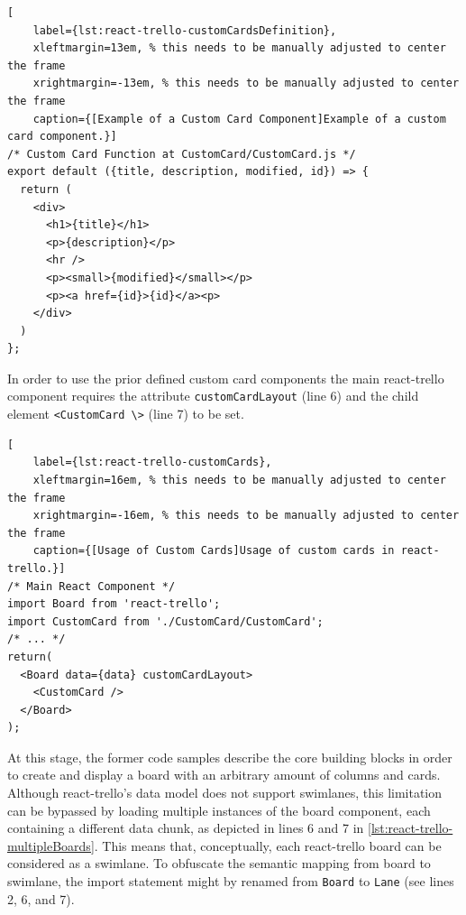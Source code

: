 \begin{spacing}{0.9}
    \lstset{language=JavaScript}
    \begin{lstlisting}[
    label={lst:react-trello-customCardsDefinition},
    xleftmargin=13em, % this needs to be manually adjusted to center the frame
    xrightmargin=-13em, % this needs to be manually adjusted to center the frame
    caption={[Example of a Custom Card Component]Example of a custom card component.}]
/* Custom Card Function at CustomCard/CustomCard.js */
export default ({title, description, modified, id}) => {
  return (
    <div>
      <h1>{title}</h1>
      <p>{description}</p>
      <hr />
      <p><small>{modified}</small></p>
      <p><a href={id}>{id}</a><p>
    </div>
  )
};
    \end{lstlisting}
\end{spacing}

\noindent In order to use the prior defined custom card components the main react-trello component requires the attribute \texttt{customCardLayout} (line 6) and the child element \texttt{<CustomCard \textbackslash>} (line 7) to be set.

\begin{spacing}{0.9}
    \lstset{language=JavaScript}
    \begin{lstlisting}[
    label={lst:react-trello-customCards},
    xleftmargin=16em, % this needs to be manually adjusted to center the frame
    xrightmargin=-16em, % this needs to be manually adjusted to center the frame
    caption={[Usage of Custom Cards]Usage of custom cards in react-trello.}]
/* Main React Component */
import Board from 'react-trello';
import CustomCard from './CustomCard/CustomCard';
/* ... */
return(
  <Board data={data} customCardLayout>
    <CustomCard />
  </Board>
);
    \end{lstlisting}
\end{spacing}

\noindent At this stage, the former code samples describe the core building blocks in order to create and display a board with an arbitrary amount of columns and cards. Although react-trello’s data model does not support swimlanes, this limitation can be bypassed by loading multiple instances of the board component, each containing a different data chunk, as depicted in lines 6 and 7 in \autoref{lst:react-trello-multipleBoards}. This means that, conceptually, each react-trello board can be considered as a swimlane. To obfuscate the semantic mapping from board to swimlane, the import statement might by renamed from \texttt{Board} to \texttt{Lane} (see lines 2, 6, and 7).

